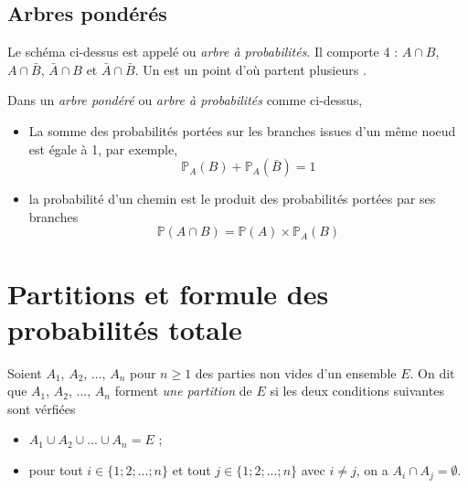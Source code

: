 \documentclass[french]{book}
\begin{document}
\subsection{Arbres pondérés}

\begin{center}
\end{center}
\begin{defn}
Le schéma ci-dessus est appelé  ou \emph{arbre à probabilités}. Il comporte 4  : $A\cap B$, $A\cap \bar{B}$, $\bar{A}\cap B$ et $\bar{A}\cap \bar{B}$. Un  est un point d'où partent plusieurs .
\end{defn}



\begin{prop}
Dans un \emph{arbre pondéré} ou \emph{arbre à probabilités} comme ci-dessus,
\begin{itemize}
\item[$\bullet$] La somme des probabilités portées sur les branches issues d'un même noeud est égale à 1, par exemple, 
$$\mathbb{P}_A(B)+\mathbb{P}_A(\bar{B})=1$$
\item[$\bullet$] la probabilité d'un chemin est le produit des probabilités portées par ses branches 
$$\mathbb{P}(A\cap B)=\mathbb{P}(A) \times \mathbb{P}_A(B)$$
\end{itemize}
\end{prop}


\section{Partitions et formule des probabilités totale}

\begin{defn}
 Soient $A_1$, $A_2$, ..., $A_n$ pour $n\geq 1$ des parties non vides d'un ensemble $E$. On dit que $A_1$, $A_2$, ..., $A_n$ forment \emph{une partition} de $E$ si les deux conditions suivantes sont vérfiées 
\begin{itemize}
 \item[$\bullet$] $A_1\cup A_2\cup ... \cup A_n=E$ ;
\item[$\bullet$] pour tout $i\in \{1;2;...;n\}$ et tout $j\in\{1;2;...;n\}$ avec $i\neq j$, on a $A_i\cap A_j=\emptyset$.
\end{itemize}
\end{defn}
\end{document}
